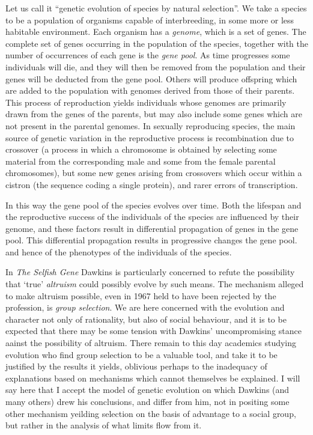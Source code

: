\documentclass[10pt,titlepage]{article}
\begin{document}
Let us call it ``genetic evolution of species by natural selection''.
We take a species to be a population of organisms capable of interbreeding, in some more or less habitable environment.
Each organism has a \emph{genome}, which is a set of genes.
The complete set of genes occurring in the population of the species, together with the number of occurrences of each gene is the \emph{gene pool}.
As time progresses some individuals will die, and they will then be removed from the population and their genes will be deducted from the gene pool.
Others will produce offspring which are added to the population with genomes derived from those of their parents.
This process of reproduction yields individuals whose genomes are primarily drawn from the genes of the parents, but may also include some genes which are not present in the parental genomes.
In sexually reproducing species, the main source of genetic variation in the reproductive process is recombination due to crossover (a process in which a chromosome is obtained by selecting some material from the corresponding male and some from the female parental chromosomes), but some new genes arising from crossovers which occur within a cistron (the sequence coding a single protein), and rarer errors of transcription. 


In this way the gene pool of the species evolves over time.
Both the lifespan and the reproductive success of the individuals of the species are influenced by their genome, and these factors result in differential propagation of genes in the gene pool.
This differential propagation results in progressive changes the gene pool. and hence of the phenotypes of the individuals of the species.

In \emph{The Selfish Gene} Dawkins is particularly concerned to refute the possibility that `true' \emph{altruism} could possibly evolve by such means.
The mechanism alleged to make altruism possible, even in 1967 held to have been rejected by the profession, is \emph{group selection}.
We are here concerned with the evolution and character not only of rationality, but also of social behaviour, and it is to be expected that there may be some tension with Dawkins' uncompromising stance aainst the possibility of altruism.
There remain to this day academics studying evolution who find group selection to be a valuable tool, and take it to be justified by the results it yields, oblivious perhaps to the inadequacy of explanations based on mechanisms which cannot themselves be explained.
I will say here that I accept the model of genetic evolution on which Dawkins (and many others) drew his conclusions, and differ from him, not in positing some other mechanism yeilding selection on the basis of advantage to a social group, but rather in the analysis of what limits flow from it.
\end{document}
